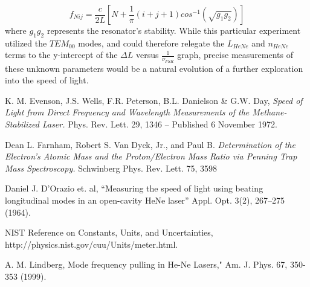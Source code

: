\documentclass[journal, a4paper]{IEEEtran}
\begin{document}
$$f_{Nij} = \frac{c}{2L} [N + \frac{1}{\pi}(i + j + 1 )cos^{-1}(\sqrt{g_{1}g_{2}})]$$
where $g_{1}g_{2}$ represents the resonator's stability. While this particular experiment utilized the $TEM_{00}$ modes, and could therefore relegate the $L_{HeNe}$ and $n_{HeNe}$ terms to the y-intercept of the $\Delta L$ versus $\frac{1}{\nu_{FSR}}$ graph,  precise measurements of these unknown parameters would be a natural evolution of a further exploration into the speed of light. 




\begin{thebibliography}{5}


	K. M. Evenson, J.S. Wells, F.R. Peterson, B.L. Danielson \& G.W. Day, {\em Speed of Light from Direct Frequency and Wavelength Measurements of the Methane-Stabilized Laser.} Phys. Rev. Lett. 29, 1346 – Published 6 November 1972.
    
    Dean L. Farnham, Robert S. Van Dyck, Jr., and Paul B. {\em Determination of the Electron's Atomic Mass and the Proton/Electron Mass Ratio via Penning Trap Mass Spectroscopy.} Schwinberg
	Phys. Rev. Lett. 75, 3598
    
	Daniel J. D'Orazio et. al, “Measuring the speed of light using beating longitudinal modes in an open-cavity HeNe laser” Appl. Opt. 3(2), 267–275 (1964).
    
    NIST Reference on Constants, Units, and Uncertainties, 		      																	 http://physics.nist.gov/cuu/Units/meter.html.
    
    A. M. Lindberg, Mode frequency pulling in He-Ne
    Lasers," Am. J. Phys. 67, 350-353 (1999).

\end{thebibliography}

	
    
\end{document}
